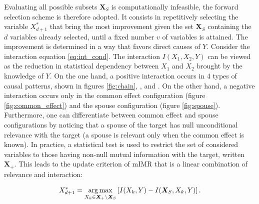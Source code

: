 Evaluating all possible subsets $\bm X_S$ is computationally infeasible, the
forward selection scheme is therefore adopted. It consists in repetitively
selecting the variable $X_{d+1}^*$ that bring the most improvement given the set
$\bm X_S$ containing the $d$ variables already selected, until a fixed number
$v$ of variables is attained. The improvement is determined in a way that favors
direct causes of $Y$. Consider the interaction equation \ref{eq:int_cond}. The
interaction $I(X_1, X_2, Y)$ can be viewed as the reduction in statistical
dependency between $X_1$ and $X_2$ brought by the knowledge of $Y$. On the one
hand, a positive interaction occurs in 4 types of causal patterns, shown in
figures \ref{fig:chain}, ,  and
. On the other hand, a negative interaction occurs only
in the common effect configuration (figure \ref{fig:common_effect}) and the
spouse configuration (figure \ref{fig:spouse}). Furthermore, one can
differentiate between common effect and spouse configurations by noticing that a
spouse of the target has null unconditional relevance with the target (a spouse
is relevant only when the common effect is known). In practice, a statistical
test is used to restrict the set of considered variables to those having
non-null mutual information with the target, written $\bm X_+$. This leads to
the update criterion of mIMR that is a linear combination of relevance and
interaction:

\begin{equation}
    X_{d+1}^* = \operatorname*{arg\,max}_{X_k\in\bm X_+ \setminus \bm X_S}
    \left[ I(X_k,Y) - I(\bm X_S, X_k, Y)\right].
\end{equation}


